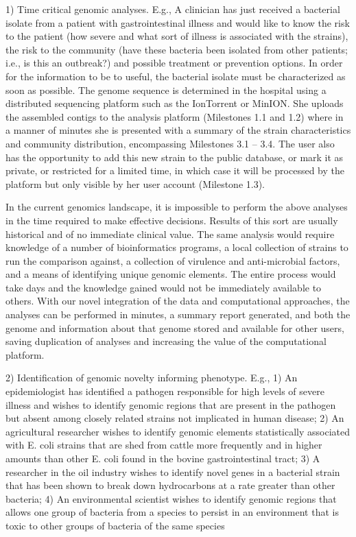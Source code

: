 \documentclass[letterpaper,12pt]{report}
\begin{document}
1) Time critical genomic analyses. E.g., A clinician has just received a bacterial isolate from a patient with gastrointestinal illness and would like to know the risk to the patient (how severe and what sort of illness is associated with the strains), the risk to the community (have these bacteria been isolated from other patients; i.e., is this an outbreak?) and possible treatment or prevention options. In order for the information to be to useful, the bacterial isolate must be characterized as soon as possible. The genome sequence is determined in the hospital using a distributed sequencing platform such as the IonTorrent or MinION. She uploads the assembled contigs to the analysis platform (Milestones 1.1 and 1.2) where in a manner of minutes she is presented with a summary of the strain characteristics and community distribution, encompassing Milestones 3.1 – 3.4. The user also has the opportunity to add this new strain to the public database, or mark it as private, or restricted for a limited time, in which case it will be processed by the platform but only visible by her user account (Milestone 1.3).


In the current genomics landscape, it is impossible to perform the above analyses in the time required to make effective decisions. Results of this sort are usually historical and of no immediate clinical value. The same analysis would require knowledge of a number of bioinformatics programs, a local collection of strains to run the comparison against, a collection of virulence and anti-microbial factors, and a means of identifying unique genomic elements. The entire process would take days and the knowledge gained would not be immediately available to others. With our novel integration of the data and computational approaches, the analyses can be performed in minutes, a summary report generated, and both the genome and information about that genome stored and available for other users, saving duplication of analyses and increasing the value of the computational platform.

 

2) Identification of genomic novelty informing phenotype. E.g., 1) An epidemiologist has identified a pathogen responsible for high levels of severe illness and wishes to identify genomic regions that are present in the pathogen but absent among closely related strains not implicated in human disease; 2) An agricultural researcher wishes to identify genomic elements statistically associated with E. coli strains that are shed from cattle more frequently and in higher amounts than other E. coli found in the bovine gastrointestinal tract; 3) A researcher in the oil industry wishes to identify novel genes in a bacterial strain that has been shown to break down hydrocarbons at a rate greater than other bacteria; 4) An environmental scientist wishes to identify genomic regions that allows one group of bacteria from a species to persist in an environment that is toxic to other groups of bacteria of the same species
\end{document}

